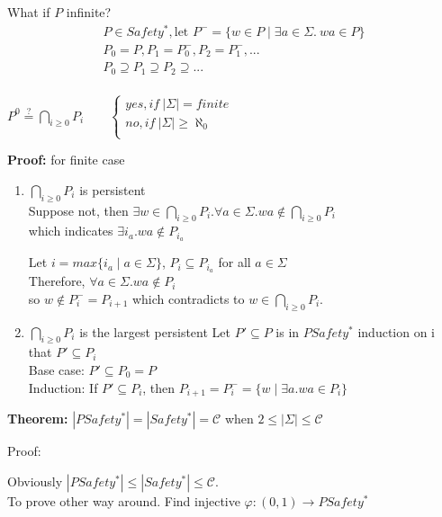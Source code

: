 \documentclass{report}
\begin{document}
\noindent
What if $P$ infinite?
$$
\begin{array}{l}
P \in Safety^*, \text{let } P^- = \{w \in P \mid \exists a\in \Sigma.\ wa \in P\}\\
P_0 = P, P_1 = P_0^-, P_2=P_1^-,...\\
P_0 \supseteq P_1 \supseteq P_2 \supseteq ... \\
\end{array}
$$



$P^0 \stackrel{?}{=} \bigcap_{i\geq 0} P_i \qquad
\begin{cases}
yes, if\ |\Sigma| = finite\\
no, if\ |\Sigma| \geq \aleph_0\\
\end{cases}
$

\noindent
\textbf{Proof:} for finite case
\begin{enumerate}

\item $\bigcap_{i\geq 0} P_i$ is persistent\\
Suppose not, then $\exists w \in \bigcap_{i\geq 0} P_i.\forall a \in \Sigma. wa \notin \bigcap_{i\geq 0} P_i$\\
which indicates $\exists i_a. wa \notin P_{i_a}$

Let $i = max\{i_a \mid a \in \Sigma \}$, $P_i \subseteq P_{i_a}$ for all $a \in \Sigma$\\
Therefore, $\forall a \in \Sigma. wa \notin P_i$\\
so $w \notin P_i^- = P_{i+1}$ which contradicts to $w \in \bigcap_{i\geq 0} P_i$.

\item $\bigcap_{i\geq 0} P_i$ is the largest persistent
Let $P' \subseteq P$ is in $PSafety^*$ induction on i that $P' \subseteq P_i$\\
Base case: $P' \subseteq P_0 = P$\\
Induction: If $P' \subseteq P_i$, then $P_{i+1} = P_i^- = \{w \mid \exists a. wa \in P_i\}$

\end{enumerate}

\newpage

\noindent
\textbf{Theorem:} $|PSafety^*| = |Safety^*| = \mathcal{C}$
when $2 \leq |\Sigma| \leq \mathcal{C}$

\noindent
Proof:

Obviously $|PSafety^*| \leq |Safety^*| \leq \mathcal{C}$. \\
To prove other way around. Find injective $\varphi :　(0,1) \to PSafety^*$
\end{document}
